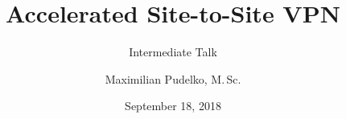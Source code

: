 \usepackage[utf8]{inputenc}
\usepackage{packages}
\usepackage{beamermods}

\author[M. Pudelko]{Maximilian Pudelko, M.\,Sc.}
\title[MoonWire]{Accelerated Site-to-Site VPN}
\subtitle{Intermediate Talk}
\date{September 18, 2018}



\usepackage{pgfpages}
\usepackage{ifthen}
\newif\ifsolution%
